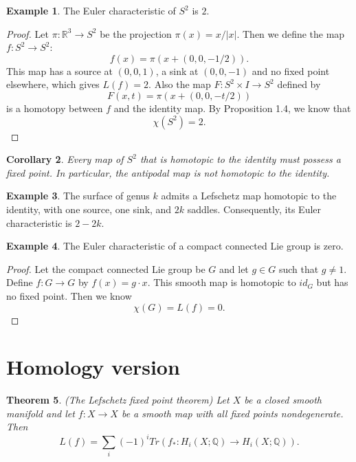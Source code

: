 \documentclass[psamsfonts]{amsart}
\newtheorem{theorem}{Theorem}[section]
\newtheorem{cor}[theorem]{Corollary}
\theoremstyle{definition}
\newtheorem{exmp}[theorem]{Example}
\theoremstyle{remark}
\numberwithin{equation}{section}
\begin{document}
		\begin{exmp}
			The Euler characteristic of $S^2$ is $2$.
		\end{exmp}
		\begin{proof}
			Let $\pi : \mathbb{R}^3 \to S^2$ be the projection $\pi (x) = x/|x|$. Then we define the map $f: S^2 \to S^2$:
			\begin{equation}
				f(x) = \pi (x+(0,0,-1/2)).
			\end{equation}
			This map has a source at $(0,0,1)$, a sink at $(0,0,-1)$ and no fixed point elsewhere, which gives $L(f) = 2$. Also the map $F: S^2 \times I \to S^2$ defined by
			\begin{equation}
				F(x,t) = \pi (x+(0,0,-t/2))
			\end{equation}
			is a homotopy between $f$ and the identity map. By Proposition 1.4, we know that 
			\begin{equation}
				\chi (S^2) = 2.
			\end{equation}
		\end{proof}					
		
		\begin{cor}
			Every map of $S^2$ that is homotopic to the identity must possess a fixed point. In particular, the antipodal map is not homotopic to the identity.
		\end{cor}
		\begin{exmp}
			The surface of genus $k$ admits a Lefschetz map homotopic to the identity, with one source, one sink, and $2k$ saddles. Consequently, its Euler characteristic is $2-2k$.
		\end{exmp}
		
		\begin{exmp}
			The Euler characteristic of a compact connected Lie group is zero.
		\end{exmp}
		\begin{proof}
			Let the compact connected Lie group be $G$ and let $g \in G$ such that $g \neq 1$. Define $f: G \to G$ by $f(x) = g \cdot x$. This smooth map is homotopic to $id_G$ but has no fixed point. Then we know
			\begin{equation}
				\chi (G) = L(f) = 0.
			\end{equation}
		\end{proof}
		
		\section{Homology version}
		\begin{theorem}(The Lefschetz fixed point theorem)
			Let $X$ be a closed smooth manifold and let $f: X \to X$ be a smooth map with all fixed points nondegenerate. Then
			\begin{equation}
				L(f) = \sum_{i} (-1)^i Tr(f_*: H_i(X;\mathbb{Q}) \to H_i(X;\mathbb{Q})).
			\end{equation}
		\end{theorem}
		
\end{document}
